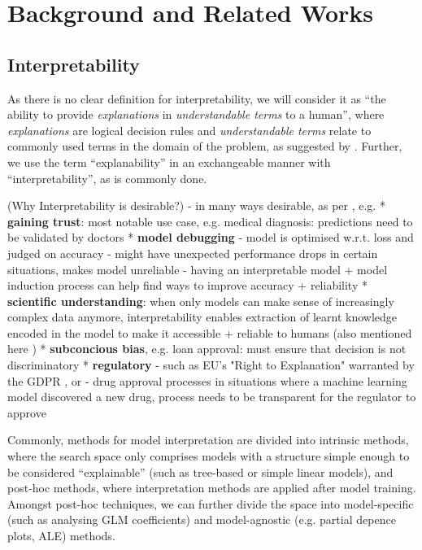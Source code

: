 \documentclass[twoside,11pt]{article}
\begin{document}


\section{Background and Related Works}

\subsection{Interpretability}
As there is no clear definition for interpretability, we will consider it as ``the ability to provide \textit{explanations} in \textit{understandable terms} to a human'',
where \textit{explanations} are logical decision rules and \textit{understandable terms} relate to commonly used terms in the domain of the problem,
as suggested by \citet[chap. 1]{survey_NN_interpretability}.
Further, we use the term ``explanability'' in an exchangeable manner with ``interpretability'', as is commonly done.

(Why Interpretability is desirable?)
- in many ways desirable, as per \citet[pp. 3-4]{Zach2019InterpretabilityOD}, e.g.
  * \textbf{gaining trust}: most notable use case, e.g. medical diagnosis: predictions need to be validated by doctors \citep[p. 1]{review_NN_interpretability}
  * \textbf{model debugging}
    - model is optimised w.r.t. loss and judged on accuracy
    - might have unexpected performance drops in certain situations, makes model unreliable \citep[1B]{survey_NN_interpretability}
    - having an interpretable model + model induction process can help find ways to improve accuracy + reliability
  * \textbf{scientific understanding}: when only models can make sense of increasingly complex data anymore, interpretability enables extraction of learnt knowledge encoded
    in the model to make it accessible + reliable to humans (also mentioned here \citep[p. 1]{review_NN_interpretability})
  * \textbf{subconcious bias}, e.g. loan approval: must ensure that decision is not discriminatory
  * \textbf{regulatory}
    - such as EU's "Right to Explanation" warranted by the GDPR \citep[p. 1]{review_NN_interpretability}, \citep[1B]{survey_NN_interpretability} or
    - drug approval processes in situations where a machine learning model discovered a new drug, process needs to be transparent for the regulator to approve \citep[1B]{survey_NN_interpretability}

Commonly, methods for model interpretation are divided into intrinsic methods, where the search space only comprises models with a structure simple enough to be
considered ``explainable'' (such as tree-based or simple linear models), and post-hoc methods, where interpretation methods are applied after model training.
Amongst post-hoc techniques, we can further divide the space into model-specific (such as analysing GLM coefficients) and model-agnostic
(e.g. partial depence plots, ALE) methods. \citet[chap. 3.2]{molnar2022}
\end{document}
